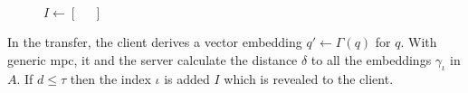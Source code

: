 \begin{figure} [H]
\begin{minipage}{0.49\textwidth}
\begin{algorithm}[H]
            \vspace*{0.48cm}
        
            \MPC{} {
    
            
                \KwOut{\phantom{$ I $}}
    
                $ I \gets \left[ \phantom{=} \right] $
    
    
            }

            \vspace*{0.48cm}
    
            \KwRet{\phantom{$ I $}}
    
        \end{algorithm}
    \end{minipage} 
\end{figure}


In the transfer, the client derives a vector embedding $ q' \gets \Gamma \left(q\right) $ for $ q $. With generic \acrshort{mpc}, it and the server calculate the distance $ \delta $ to all the embeddings $ \gamma_{\iota} $ in $ A $. If $ d \leq \tau $ then the index $ \iota $ is added $ I $ which is revealed to the client.
